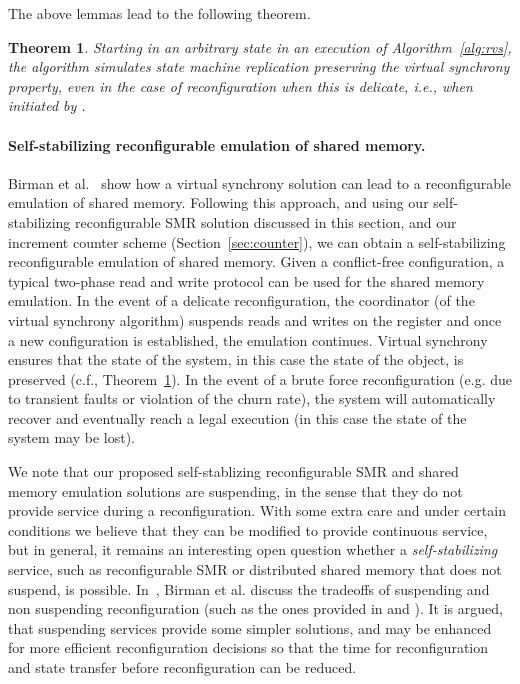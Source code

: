 \documentclass[11pt]{article}
\newtheorem{theorem}{Theorem}[section]
\begin{document}
\noindent The above lemmas lead to the following theorem.

\begin{theorem}
\label{thVS:finalApp}
Starting in an arbitrary state in an execution  of Algorithm~\ref{alg:rvs}, the algorithm simulates state machine replication preserving the virtual synchrony property, even in the case of reconfiguration when this is delicate, i.e., when initiated by .
\end{theorem}

\paragraph{Self-stabilizing reconfigurable emulation of shared memory.} Birman et al.~\cite{birmanMR2010} show how a virtual synchrony solution can lead to a reconfigurable emulation of shared memory. 
Following this approach, and using our self-stabilizing reconfigurable SMR solution discussed in this section, and our increment counter scheme (Section~\ref{sec:counter}), we can obtain a self-stabilizing reconfigurable emulation of shared memory.
Given a conflict-free configuration, a typical two-phase read and write protocol can be used for the shared memory emulation.
In the event of a delicate reconfiguration, the coordinator (of the virtual synchrony algorithm) suspends reads and writes on the register and once a new configuration is established, the emulation continues.
Virtual synchrony ensures that the state of the system, in this case the state of the object, is preserved (c.f., Theorem~\ref{thVS:finalApp}).
In the event of a brute force reconfiguration (e.g. due to transient faults or violation of the churn rate), the system will automatically recover and eventually reach a legal execution (in this case the state of the system may be lost).

We note that our proposed self-stablizing reconfigurable SMR and shared memory emulation solutions are suspending, in the sense that 
they do not provide service during a reconfiguration. With some extra care and under certain conditions we believe that they
can be modified to provide continuous service, but in general, it remains an interesting open question whether a \emph{self-stabilizing} 
service, such as reconfigurable SMR or distributed shared memory that does not suspend, is possible. In~\cite{birmanMR2010}, Birman et al. discuss the tradeoffs of suspending and non suspending reconfiguration (such as the ones provided in \cite{RAMBO} and \cite{DynaStore}). It is argued, that suspending services provide some simpler solutions, and may be enhanced for more efficient reconfiguration decisions so that the time for reconfiguration and state transfer before reconfiguration can be reduced.
\end{document}
